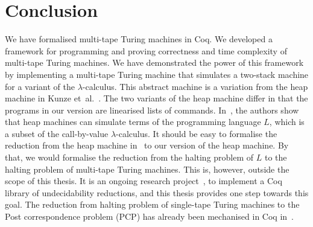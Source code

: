\chapter{Conclusion}
\label{chap:conclusion}

We have formalised multi-tape Turing machines in Coq.  We developed a framework for programming and proving correctness and time complexity of
multi-tape Turing machines.  We have demonstrated the power of this framework by implementing a multi-tape Turing machine that simulates a two-stack
machine for a variant of the $\lambda$-calculus.  This abstract machine is a variation from the heap machine in Kunze
et~al.~\cite{KunzeEtAl:2018:Formal}.  The two variants of the heap machine differ in that the programs in our version are linearised lists of
commands.  In~\cite{KunzeEtAl:2018:Formal}, the authors show that heap machines can simulate terms of the programming language $L$, which is a subset
of the call-by-value $\lambda$-calculus.  It should be easy to formalise the reduction from the heap machine in~\cite{KunzeEtAl:2018:Formal} to our
version of the heap machine.  By that, we would formalise the reduction from the halting problem of $L$ to the halting problem of multi-tape Turing
machines.  This is, however, outside the scope of this thesis.  It is an ongoing research project~\cite{ForsterLOLA2018}, to implement a Coq library
of undecidability reductions, and this thesis provides one step towards this goal.  The reduction from halting problem of single-tape Turing machines
to the Post correspondence problem (PCP) has already been mechanised in Coq in~\cite{PCPITP}.

